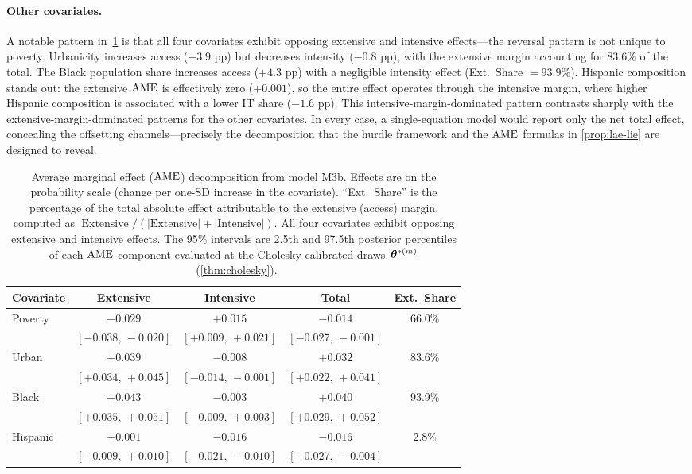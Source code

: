 \paragraph{Other covariates.}
A notable pattern in~\cref{tab:ame-decomp} is that all four covariates
exhibit opposing extensive and intensive effects---the reversal pattern is
not unique to poverty. Urbanicity increases access ($+3.9$ pp) but decreases
intensity ($-0.8$ pp), with the extensive margin accounting for 83.6\% of
the total. The Black population share increases access ($+4.3$ pp) with a
negligible intensity effect (Ext.\ Share $= 93.9\%$). Hispanic composition
stands out: the extensive $\text{AME}$ is effectively zero ($+0.001$), so the
entire effect operates through the intensive margin, where higher Hispanic
composition is associated with a lower IT share ($-1.6$ pp). This
intensive-margin-dominated pattern contrasts sharply with the
extensive-margin-dominated patterns for the other covariates. In every case,
a single-equation model would report only the net total effect, concealing
the offsetting channels---precisely the decomposition that the hurdle
framework and the $\text{AME}$ formulas in \cref{prop:lae-lie} are designed to
reveal.

\begin{table}[t]
\centering
\caption{Average marginal effect ($\text{AME}$) decomposition from model M3b.
  Effects are on the probability scale (change per one-SD increase in the
  covariate). ``Ext.\ Share'' is the percentage of the total absolute
  effect attributable to the extensive (access) margin, computed as
  $|\text{Extensive}|/(|\text{Extensive}| + |\text{Intensive}|)$.
  All four covariates
  exhibit opposing extensive and intensive effects.  The 95\% intervals
  are 2.5th and 97.5th posterior percentiles of each $\text{AME}$ component
  evaluated at the Cholesky-calibrated
  draws~$\boldsymbol{\theta}^{*(m)}$~(\cref{thm:cholesky}).}\label{tab:ame-decomp}
\smallskip
\begin{tabular}{@{}lcccc@{}}
\toprule
Covariate & Extensive & Intensive & Total & Ext.\ Share \\
\midrule
Poverty & $-0.029$ & $+0.015$ & $-0.014$ & 66.0\% \\
 & $[-0.038,\,-0.020]$ & $[+0.009,\,+0.021]$ & $[-0.027,\,-0.001]$ & \\[3pt]
Urban & $+0.039$ & $-0.008$ & $+0.032$ & 83.6\% \\
 & $[+0.034,\,+0.045]$ & $[-0.014,\,-0.001]$ & $[+0.022,\,+0.041]$ & \\[3pt]
Black & $+0.043$ & $-0.003$ & $+0.040$ & 93.9\% \\
 & $[+0.035,\,+0.051]$ & $[-0.009,\,+0.003]$ & $[+0.029,\,+0.052]$ & \\[3pt]
Hispanic & $+0.001$ & $-0.016$ & $-0.016$ & 2.8\% \\
 & $[-0.009,\,+0.010]$ & $[-0.021,\,-0.010]$ & $[-0.027,\,-0.004]$ & \\
\bottomrule
\end{tabular}
\end{table}

